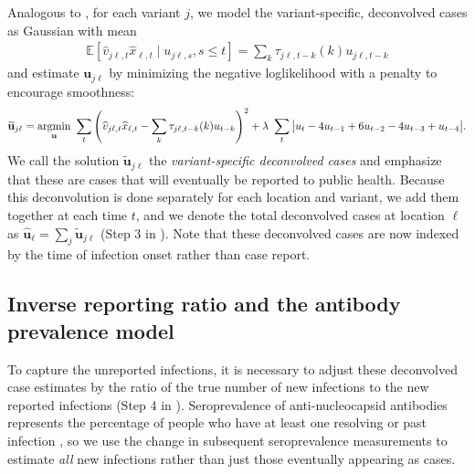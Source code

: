Analogous to , for each variant $j$,
we model the variant-specific, deconvolved cases as Gaussian with mean
\begin{align}
  \mathbb{E}\left[\widehat{v}_{j\ell,t}\widehat{x}_{\ell,t} \mid u_{j\ell,s}, s \leq t  \right] = \sum_k \tau_{j\ell,t-k}(k) u_{j\ell,t-k} 
\end{align}
and estimate $\mathbf{u}_{j\ell}$ by minimizing the negative loglikelihood with
a penalty to encourage smoothness:
\begin{align}
\widetilde{\mathbf{u}}_{j\ell} = \operatorname*{argmin}_{\mathbf{u}}\ \sum_{t} 
\left( 
    \widehat{v}_{j\ell,t} \widehat{x}_{\ell,t} -  
    \sum_k \tau_{j\ell,t-k}(k) u_{t-k} 
\right)^2 
+ \lambda\ \sum_{t} \big|u_{t} - 4u_{t-1} + 6u_{t-2} -4u_{t-3}+ u_{t-4}\big|.
\end{align} 
We call the solution $\widetilde{\mathbf{u}}_{j\ell}$ the \emph{variant-specific
deconvolved cases} and emphasize that these are cases that will eventually
be reported to public health. Because this deconvolution is done separately for
each location and variant, we add them together at each time $t$, and
we denote the total deconvolved cases at location $\ell$ as
$\widehat{\mathbf{u}}_\ell = \sum_j \widetilde{\mathbf{u}}_{j\ell}$ (Step 3 in
). Note that these deconvolved cases are now
indexed by the time of infection onset rather than case report.




\subsection{Inverse reporting ratio and the antibody prevalence model} 
\label{sec:report-ratio}

To capture the unreported infections, it is necessary to adjust these
deconvolved case estimates by the ratio of the true number of new infections to
the new reported infections (Step 4 in ). 
Seroprevalence of anti-nucleocapsid antibodies represents the percentage
of people who have at least one resolving or past infection \citep{cdc2020data},
so we use the change in subsequent seroprevalence measurements to estimate
\emph{all} new infections rather than just those eventually appearing as cases.

